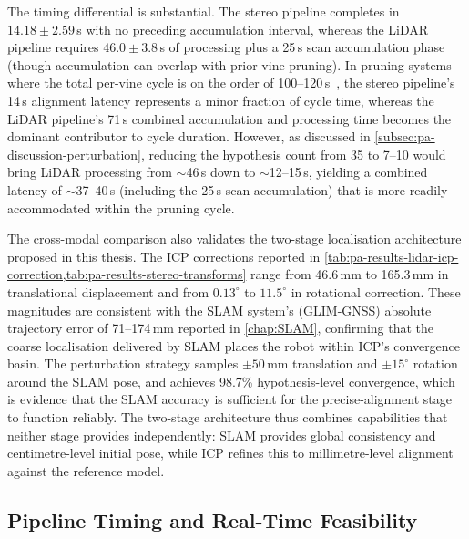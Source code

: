The timing differential is substantial. The stereo pipeline completes in $14.18 \pm 2.59$\,s with no preceding accumulation interval, whereas the LiDAR pipeline requires $46.0 \pm 3.8$\,s of processing plus a 25\,s scan accumulation phase (though accumulation can overlap with prior-vine pruning). In pruning systems where the total per-vine cycle is on the order of 100--120\,s~\cite{botterillRobotSystemPruning2017, hizatateDevelopmentRobotPruning2025}, the stereo pipeline's 14\,s alignment latency represents a minor fraction of cycle time, whereas the LiDAR pipeline's 71\,s combined accumulation and processing time becomes the dominant contributor to cycle duration. However, as discussed in \cref{subsec:pa-discussion-perturbation}, reducing the hypothesis count from 35 to 7--10 would bring LiDAR processing from $\sim$46\,s down to $\sim$12--15\,s, yielding a combined latency of $\sim$37--40\,s (including the 25\,s scan accumulation) that is more readily accommodated within the pruning cycle.

The cross-modal comparison also validates the two-stage localisation architecture proposed in this thesis. The ICP corrections reported in \cref{tab:pa-results-lidar-icp-correction,tab:pa-results-stereo-transforms} range from 46.6\,mm to 165.3\,mm in translational displacement and from $0.13^{\circ}$ to $11.5^{\circ}$ in rotational correction. These magnitudes are consistent with the SLAM system's (GLIM-GNSS) absolute trajectory error of 71--174\,mm reported in \cref{chap:SLAM}, confirming that the coarse localisation delivered by SLAM places the robot within ICP's convergence basin. The perturbation strategy samples $\pm 50$\,mm translation and $\pm 15^{\circ}$ rotation around the SLAM pose, and achieves 98.7\% hypothesis-level convergence, which is evidence that the SLAM accuracy is sufficient for the precise-alignment stage to function reliably. The two-stage architecture thus combines capabilities that neither stage provides independently: SLAM provides global consistency and centimetre-level initial pose, while ICP refines this to millimetre-level alignment against the reference model.

\subsection{Pipeline Timing and Real-Time Feasibility}
\label{subsec:pa-discussion-timing}

